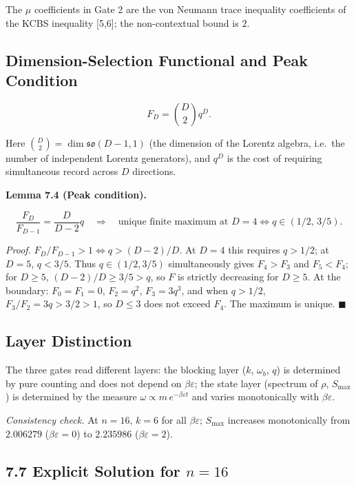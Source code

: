 \documentclass[
  11pt,
]{article}
\begin{document}
The \(\mu\) coefficients in Gate 2 are the von Neumann trace inequality
coefficients of the KCBS inequality {[}5,6{]}; the non-contextual bound
is \(2\).

\subsection{Dimension-Selection Functional and Peak
Condition}\label{dimension-selection-functional-and-peak-condition}

\[
F_D = \binom{D}{2}q^D.
\tag{7.8}
\]

Here \(\binom{D}{2}=\dim\mathfrak{so}(D-1,1)\) (the dimension of the
Lorentz algebra, i.e.~the number of independent Lorentz generators), and
\(q^D\) is the cost of requiring simultaneous record across \(D\)
directions.

\textbf{Lemma 7.4 (Peak condition).}

\[
\frac{F_D}{F_{D-1}} = \frac{D}{D-2}q \quad\Longrightarrow\quad \text{unique finite maximum at }D=4 \iff q\in(1/2,\,3/5).
\tag{7.9}
\]

\emph{Proof.} \(F_D/F_{D-1}>1\iff q>(D-2)/D\). At \(D=4\) this requires
\(q>1/2\); at \(D=5\), \(q<3/5\). Thus \(q\in(1/2,3/5)\) simultaneously
gives \(F_4>F_3\) and \(F_5<F_4\); for \(D\ge5\), \((D-2)/D\ge3/5>q\),
so \(F\) is strictly decreasing for \(D\ge5\). At the boundary:
\(F_0=F_1=0\), \(F_2=q^2\), \(F_3=3q^3\), and when \(q>1/2\),
\(F_3/F_2=3q>3/2>1\), so \(D\le3\) does not exceed \(F_4\). The maximum
is unique. \(\blacksquare\)

\subsection{Layer Distinction}\label{layer-distinction}

The three gates read different layers: the blocking layer (\(k\),
\(\omega_b\), \(q\)) is determined by pure counting and does not depend
on \(\beta\varepsilon\); the state layer (spectrum of \(\rho\),
\(S_{\max}\)) is determined by the measure
\(\omega\propto m\,e^{-\beta\varepsilon t}\) and varies monotonically
with \(\beta\varepsilon\).

\emph{Consistency check.} At \(n=16\), \(k=6\) for all
\(\beta\varepsilon\); \(S_{\max}\) increases monotonically from
\(2.006279\) (\(\beta\varepsilon=0\)) to \(2.235986\)
(\(\beta\varepsilon=2\)).

\subsection{\texorpdfstring{7.7 Explicit Solution for
\(n=16\)}{7.7 Explicit Solution for n=16}}\label{explicit-solution-for-n16}
\end{document}
